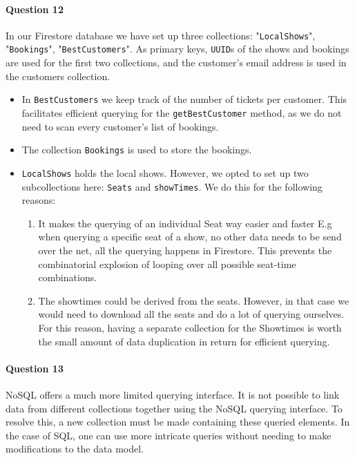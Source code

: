 \documentclass{ds-report}
\begin{document}
	\paragraph{Question 12} 
	In our Firestore database we have set up three collections: "\texttt{LocalShows}", "\texttt{Bookings}", "\texttt{BestCustomers}". As primary keys, \texttt{UUID}s of the shows and bookings are used for the first two collections, and the customer's email address is used in the customers collection. \begin{itemize} 
		\item In \texttt{BestCustomers} we keep track of the number of tickets per customer. This facilitates efficient querying for the \texttt{getBestCustomer} method, as we do not need to scan every customer's list of bookings.
		\item The collection \texttt{Bookings} is used to store the bookings. 
		\item \texttt{LocalShows} holds the local shows. However, we opted to set up two subcollections here: \texttt{Seats} and \texttt{showTimes}. We do this for the following reasons:
		\begin{enumerate}
			\item It makes the querying of an individual Seat way easier and faster E.g when querying a specific seat of a show, no other data needs to be send over the net, all the querying happens in Firestore. This prevents the combinatorial explosion of looping over all possible seat-time combinations.
			
			\item The showtimes could be derived from the seats. However, in that case we would need to download all the seats and do a lot of querying ourselves. For this reason, having a separate collection for the Showtimes is worth the small amount of data duplication in return for efficient querying.
		\end{enumerate}
	\end{itemize}
	
	\paragraph{Question 13} 
	NoSQL offers a much more limited querying interface. It is not possible to link data from different collections together using the NoSQL querying interface. To resolve this, a new collection must be made containing these queried elements. In the case of SQL, one can use more intricate queries without needing to make modifications to the data model.
	
\end{document}
